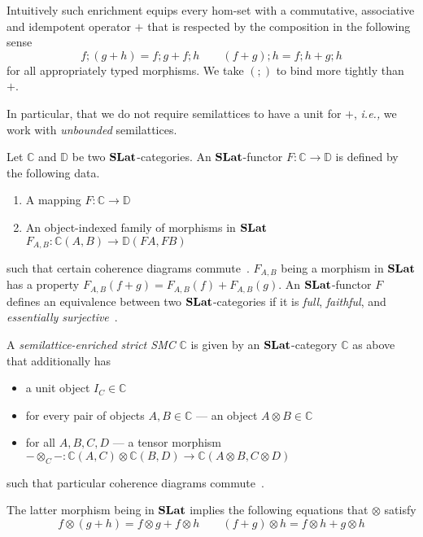 Intuitively such enrichment equips every hom-set with a commutative, associative and idempotent operator $+$ that is respected by the composition in the following sense
\[
	f ; (g+h) = f;g + f;h \qquad (f+g) ; h = f;h + g;h
\]
for all appropriately typed morphisms. 
We take $(;\!)$ to bind more tightly than $+$.

In particular,  that we do not require semilattices to have a unit for $+$, \textit{i.e.,} we work with \textit{unbounded} semilattices.

\begin{definition}
	Let $\mathbb{C}$ and $\mathbb{D}$ be two $\mathbf{SLat}$-categories.
	An $\mathbf{SLat}$-functor $F : \mathbb{C} \to \mathbb{D}$ is defined by the following data.
	\begin{enumerate}
	  \item A mapping $F : \mathbb{C} \to \mathbb{D}$
	  \item An object-indexed family of morphisms in $\mathbf{SLat}$ $F_{A,B} : \mathbb{C}(A,B) \to \mathbb{D}(FA,FB)$
	\end{enumerate}
	such that certain coherence diagrams commute~\cite{Borceux_1994}.
	$F_{A,B}$ being a morphism in $\mathbf{SLat}$ has a property $F_{A,B}(f + g) = F_{A,B}(f) + F_{A,B}(g)$.
	An $\mathbf{SLat}$-functor $F$ defines an equivalence between two $\mathbf{SLat}$-categories if it is \textit{full}, \textit{faithful}, and \textit{essentially surjective}~\cite{Kelly2022BASICCO}.
\end{definition}

\begin{definition}\label{def:enriched-prop}
A \textit{semilattice-enriched strict SMC}  $\mathbb{C}$ is given by an $\mathbf{SLat}$-category $\mathbb{C}$ as above that additionally has
\begin{itemize}
\item a unit object $I_{C} \in \mathbb{C}$
\item for every pair of objects $A,B \in \mathbb{C}$ --- an object $A \otimes B \in \mathbb{C}$
\item for all $A,B,C,D$ --- a tensor morphism $ - \otimes_{C} - : \mathbb{C}(A,C) \otimes \mathbb{C}(B,D) \to \mathbb{C}(A \otimes B, C \otimes D)$
\end{itemize}
such that particular coherence diagrams commute~\cite{enriched_monoidal}.
\end{definition}
The latter morphism being in $\mathbf{SLat}$ implies the following equations that $\otimes$ satisfy
\[
f \otimes (g+h) = f \otimes g + f \otimes h \qquad (f+g) \otimes h = f \otimes h + g \otimes h
\]

